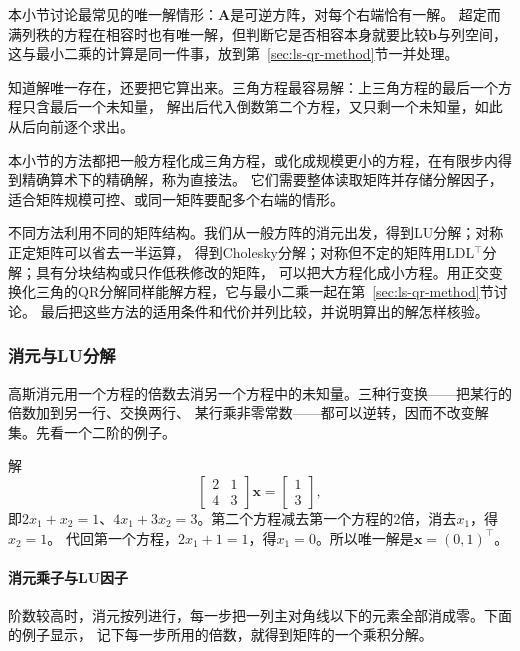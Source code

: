 本小节讨论最常见的唯一解情形：$\bm A$是可逆方阵，对每个右端恰有一解。
超定而满列秩的方程在相容时也有唯一解，但判断它是否相容本身就要比较$\bm b$与列空间，
这与最小二乘的计算是同一件事，放到第~\ref{sec:ls-qr-method}节一并处理。

知道解唯一存在，还要把它算出来。三角方程最容易解：上三角方程的最后一个方程只含最后一个未知量，
解出后代入倒数第二个方程，又只剩一个未知量，如此从后向前逐个求出。

本小节的方法都把一般方程化成三角方程，或化成规模更小的方程，在有限步内得到精确算术下的精确解，称为直接法。
它们需要整体读取矩阵并存储分解因子，适合矩阵规模可控、或同一矩阵要配多个右端的情形。

不同方法利用不同的矩阵结构。我们从一般方阵的消元出发，得到LU分解；对称正定矩阵可以省去一半运算，
得到Cholesky分解；对称但不定的矩阵用LDL$^{\top}$分解；具有分块结构或只作低秩修改的矩阵，
可以把大方程化成小方程。用正交变换化三角的QR分解同样能解方程，它与最小二乘一起在第~\ref{sec:ls-qr-method}节讨论。
最后把这些方法的适用条件和代价并列比较，并说明算出的解怎样核验。

\subsubsection{消元与LU分解}

高斯消元用一个方程的倍数去消另一个方程中的未知量。三种行变换——把某行的倍数加到另一行、交换两行、
某行乘非零常数——都可以逆转，因而不改变解集。先看一个二阶的例子。

\begin{example}[二阶方程的消元]
\label{ex:ls-elimination-two-by-two}
解
\[
 \begin{bmatrix}2&1\\4&3\end{bmatrix}\bm x=\begin{bmatrix}1\\3\end{bmatrix},
\]
即$2x_1+x_2=1$、$4x_1+3x_2=3$。第二个方程减去第一个方程的$2$倍，消去$x_1$，得$x_2=1$。
代回第一个方程，$2x_1+1=1$，得$x_1=0$。所以唯一解是$\bm x=(0,1)^\top$。
\end{example}

\paragraph{消元乘子与LU因子}

阶数较高时，消元按列进行，每一步把一列主对角线以下的元素全部消成零。下面的例子显示，
记下每一步所用的倍数，就得到矩阵的一个乘积分解。

